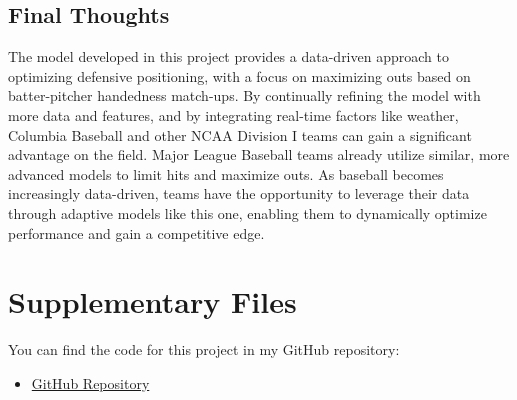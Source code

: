 \documentclass{article}
\begin{document}
\subsection{Final Thoughts}
The model developed in this project provides a data-driven approach to optimizing defensive positioning, with a focus on maximizing outs based on batter-pitcher handedness match-ups. By continually refining the model with more data and features, and by integrating real-time factors like weather, Columbia Baseball and other NCAA Division I teams can gain a significant advantage on the field. Major League Baseball teams already utilize similar, more advanced models to limit hits and maximize outs. As baseball becomes increasingly data-driven, teams have the opportunity to leverage their data through adaptive models like this one, enabling them to dynamically optimize performance and gain a competitive edge.


\newpage
\printbibliography

\section*{Supplementary Files}
You can find the code for this project in my GitHub repository:

\begin{itemize}
    \item \href{https://github.com/lillianmbradley/Undergraduate-Thesis}{GitHub Repository}
\end{itemize}
 
\end{document}
